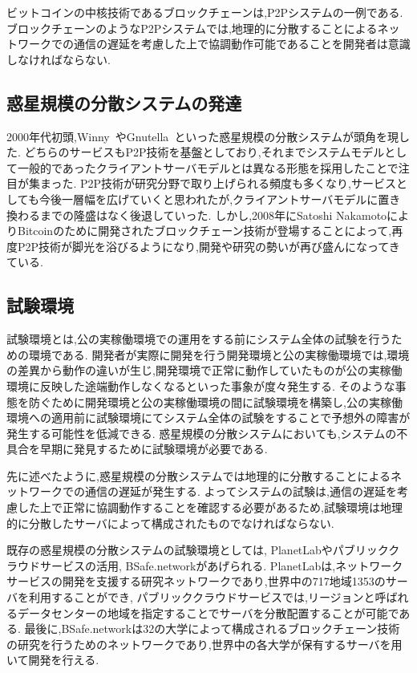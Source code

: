 ビットコインの中核技術であるブロックチェーンは,P2Pシステムの一例である.
ブロックチェーンのようなP2Pシステムでは,地理的に分散することによるネットワークでの通信の遅延を考慮した上で協調動作可能であることを開発者は意識しなければならない.

\subsection{惑星規模の分散システムの発達}

2000年代初頭,Winny~\cite{Winny}やGnutella~\cite{Gnutella}といった惑星規模の分散システムが頭角を現した.
どちらのサービスもP2P技術を基盤としており,それまでシステムモデルとして一般的であったクライアントサーバモデルとは異なる形態を採用したことで注目が集まった.
P2P技術が研究分野で取り上げられる頻度も多くなり,サービスとしても今後一層幅を広げていくと思われたが,クライアントサーバモデルに置き換わるまでの隆盛はなく後退していった.
しかし,2008年にSatoshi NakamotoによりBitcoinのために開発されたブロックチェーン技術が登場することによって,再度P2P技術が脚光を浴びるようになり,開発や研究の勢いが再び盛んになってきている.

\subsection{試験環境}

試験環境とは,公の実稼働環境での運用をする前にシステム全体の試験を行うための環境である.
開発者が実際に開発を行う開発環境と公の実稼働環境では,環境の差異から動作の違いが生じ,開発環境で正常に動作していたものが公の実稼働環境に反映した途端動作しなくなるといった事象が度々発生する.
そのような事態を防ぐために開発環境と公の実稼働環境の間に試験環境を構築し,公の実稼働環境への適用前に試験環境にてシステム全体の試験をすることで予想外の障害が発生する可能性を低減できる.
惑星規模の分散システムにおいても,システムの不具合を早期に発見するために試験環境が必要である.

先に述べたように,惑星規模の分散システムでは地理的に分散することによるネットワークでの通信の遅延が発生する.
よってシステムの試験は,通信の遅延を考慮した上で正常に協調動作することを確認する必要があるため,試験環境は地理的に分散したサーバによって構成されたものでなければならない.

既存の惑星規模の分散システムの試験環境としては, PlanetLabやパブリッククラウドサービスの活用, BSafe.networkがあげられる.
PlanetLabは,ネットワークサービスの開発を支援する研究ネットワークであり,世界中の717地域1353のサーバを利用することができ,
パブリッククラウドサービスでは,リージョンと呼ばれるデータセンターの地域を指定することでサーバを分散配置することが可能である.
最後に,BSafe.networkは32の大学によって構成されるブロックチェーン技術の研究を行うためのネットワークであり,世界中の各大学が保有するサーバを用いて開発を行える.

